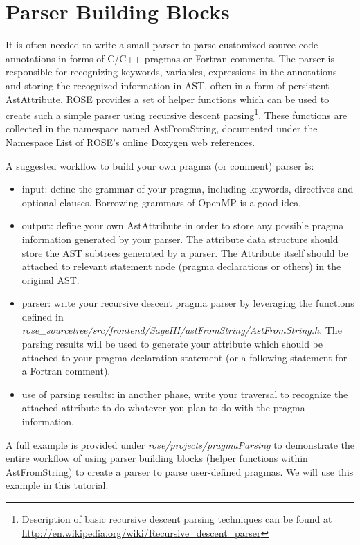 \chapter{Parser Building Blocks}
\label{chap:parserBlocks}
It is often needed to write a small parser to parse customized source code annotations in forms of C/C++ pragmas or Fortran comments.
The parser is responsible for recognizing keywords, variables, expressions in the annotations and storing the recognized information in AST, often
in a form of persistent AstAttribute.
ROSE provides a set of helper functions which can be used to create such a simple parser using recursive descent parsing\footnote{Description of basic recursive descent parsing techniques can be found at \url{http://en.wikipedia.org/wiki/Recursive_descent_parser}}. These functions are collected in the namespace named AstFromString, documented under the Namespace List of ROSE's online Doxygen web references.  

A suggested workflow to build your own pragma (or comment) parser is:
\begin{itemize}
\item  input: define the grammar of your pragma, including keywords, directives and optional clauses. Borrowing grammars of OpenMP is a good idea.
\item  output: define your own AstAttribute in order to store any possible pragma information generated by your parser. The attribute data structure should store the AST subtrees generated by a parser. The Attribute itself should be attached to relevant statement node (pragma declarations or others) in the original AST.
\item  parser: write your recursive descent pragma parser by leveraging the functions defined in  \textit{rose\_sourcetree/src/frontend/SageIII/astFromString/AstFromString.h}.  The parsing results will be used to generate your attribute which should be attached to your pragma declaration statement (or a following statement for a Fortran comment).
\item use of parsing results: in another phase, write your traversal to recognize the attached attribute to do whatever you plan to do with the pragma information.
\end{itemize}

A full example is provided under \textit{rose/projects/pragmaParsing} to demonstrate the entire workflow of using parser building blocks (helper functions within AstFromString) to create a parser to parse user-defined pragmas.  
We will use this example in this tutorial.


